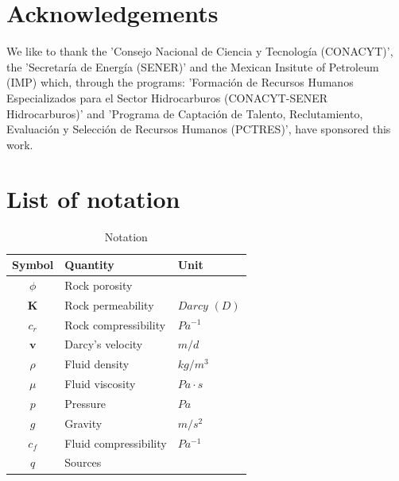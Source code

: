 \documentclass[12pt]{article}
\begin{document}
\section*{Acknowledgements}
We like to thank the 'Consejo Nacional de Ciencia y Tecnolog\'ia (CONACYT)',
the 'Secretar\'ia de Energ\'ia (SENER)' and the Mexican Insitute of Petroleum (IMP) which,
through the programs: ’Formaci\'on de Recursos Humanos Especializados para
el Sector Hidrocarburos (CONACYT-SENER Hidrocarburos)’ and ’Programa
de Captaci\'on de Talento, Reclutamiento, Evaluaci\'on y Selecci\'on de Recursos
Humanos (PCTRES)’, have sponsored this work.


\newpage

 
 \newpage
 
% 
\newpage
\newpage
\appendix
\section{List of notation}\label{a1}


\begin{table}[!h]
\centering
\begin{tabular}{c l l }
\hline
Symbol & Quantity & Unit \\[0.5ex]
\hline
$\phi$ & Rock porosity&   \\
 $\mathbf{K}$& Rock permeability&  $Darcy$ $(D)$ \\
 $c_r$& Rock compressibility&  $Pa^{-1}$ \\
$\mathbf{v}$ & Darcy's velocity& $ m/d$ \\
$\rho$ &Fluid density &  $kg/m^3$ \\
 $\mu$&Fluid viscosity & $Pa \cdot s$   \\
${p}$  &Pressure &  $Pa$ \\
$g$  &Gravity &  $m/s^2$ \\
$c_f$ &Fluid compressibility &  $Pa^{-1}$ \\
$q$ &Sources &   \\
\hline
\end{tabular}\label{table:symbols}
\caption{Notation}
\end{table}

\newpage
\end{document}
